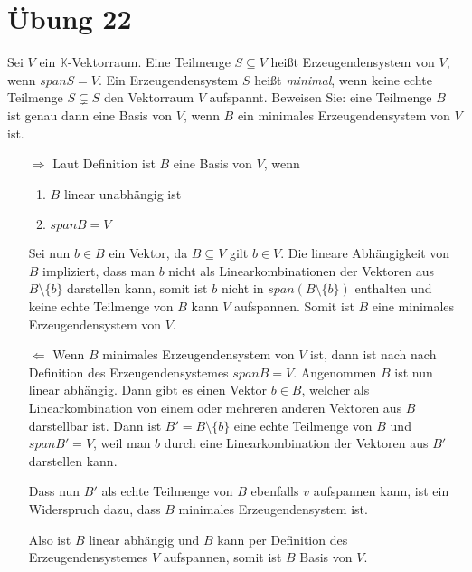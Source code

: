 \documentclass{article}
\begin{document}
\newpage
\section*{Übung 22}

Sei $V$ ein $\mathbb{K}$-Vektorraum. Eine Teilmenge $S \subseteq V$ heißt Erzeugendensystem von $V$, wenn
$span S = V$. Ein Erzeugendensystem $S$ heißt \emph{minimal}, wenn
keine echte Teilmenge $S \subsetneq S$ den Vektorraum $V$ aufspannt.
Beweisen Sie: eine Teilmenge $B$ ist genau dann eine Basis von $V$, wenn $B$ ein minimales
Erzeugendensystem von $V$ ist.

\begin{itemize}
\item[$\Rightarrow$]
  Laut Definition ist $B$ eine Basis von $V$, wenn
  \begin{enumerate}[1)]
  \item $B$ linear unabhängig ist
  \item $span B = V$
  \end{enumerate}
  Sei nun $b \in B$ ein Vektor, da $B \subseteq V$ gilt $b \in V$.
  Die lineare Abhängigkeit von $B$ impliziert, dass man $b$ nicht als Linearkombinationen der Vektoren aus
  $B \setminus \{ b \}$ darstellen kann, somit ist $b$ nicht in $span\left(B \setminus \{ b \}\right)$
  enthalten und keine echte Teilmenge von $B$ kann $V$ aufspannen.
  Somit ist $B$ eine minimales Erzeugendensystem von $V$.
\item[$\Leftarrow$]
  Wenn $B$ minimales Erzeugendensystem von $V$ ist, dann ist nach nach Definition des Erzeugendensystemes $span B = V$.
  Angenommen $B$ ist nun linear abhängig. Dann gibt es einen Vektor $b \in B$, welcher als Linearkombination von einem
  oder mehreren anderen Vektoren aus $B$ darstellbar ist. Dann ist $B' = B \setminus \{ b \}$ eine echte Teilmenge von
  $B$ und $span B' = V$, weil man $b$ durch eine Linearkombination der Vektoren aus $B'$ darstellen kann.

  Dass nun $B'$ als echte Teilmenge von $B$ ebenfalls $v$ aufspannen kann, ist ein Widerspruch dazu, dass
  $B$ minimales Erzeugendensystem ist.

  Also ist $B$ linear abhängig und $B$ kann per Definition des Erzeugendensystemes $V$ aufspannen, somit ist $B$
  Basis von $V$.
\end{itemize}
\end{document}
